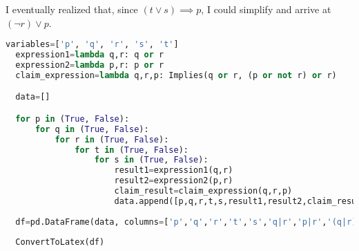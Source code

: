 \documentclass[11pt]{article}
\begin{document}
I eventually realized that, since $(t\lor s)\implies p$, I could simplify and arrive at $(\lnot r)\lor p$.
\newpage
\begin{lstlisting}[language=Python]
  variables=['p', 'q', 'r', 's', 't']
  expression1=lambda q,r: q or r
  expression2=lambda p,r: p or r
  claim_expression=lambda q,r,p: Implies(q or r, (p or not r) or r)

  data=[]

  for p in (True, False):
      for q in (True, False):
          for r in (True, False):
              for t in (True, False):
                  for s in (True, False):
                      result1=expression1(q,r)
                      result2=expression2(p,r)
                      claim_result=claim_expression(q,r,p)
                      data.append([p,q,r,t,s,result1,result2,claim_result])
                      
  df=pd.DataFrame(data, columns=['p','q','r','t','s','q|r','p|r','(q|r) implies ((p|r`)|r)'])
          
  ConvertToLatex(df)
      
\end{lstlisting}


\newpage
\hspace{-2cm}
\newpage
\end{document}
